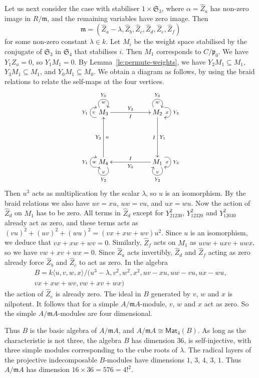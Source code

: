 \documentclass[12pt]{amsart}
\newcommand{\Mat}{\mathsf{Mat}}
\newcommand{\sym}[1]{\mathfrak{S}_{#1}}
\newcommand{\mfm}{\mathfrak{m}}
\newcommand{\mfp}{\mathfrak{p}}
\numberwithin{equation}{section}
\theoremstyle{definition}
\begin{document}
Let us next consider the case with stabiliser $1\times\sym{3}$, where
$\alpha=\hat Z_a$ has non-zero image in $R/\mfm$, and the remaining variables
have zero image. Then 
\[ \mfm=(\hat Z_a-\lambda,\hat Z_b,\hat Z_c,\hat Z_d,\hat
  Z_e,\hat Z_f)\]
for some non-zero constant $\lambda\in k$. Let $M_i$ be the weight space stabilised by the
conjugate of $\sym{3}$ in $\sym{4}$ that stabilises $i$. Then $M_1$
corresponds to $C/\mfp_0$.  We have
$Y_1Z_a=0$, so $Y_1M_1=0$. By Lemma~\ref{le:permute-weights}, we have
$Y_2M_1\subseteq M_1$, $Y_3M_1\subseteq M_1$, and 
$Y_0M_1\subseteq M_0$. We obtain a diagram as follows, by 
using the braid relations to relate the self-maps at the four vertices.
\[ \vcenter{\xymatrix@=20mm{
M_3\ar[r]^{Y_{2}}_I\ar@(dl,ul)[]^{Y_1}_{v}\ar@(ul,ur)[]^{Y_0}_{w}  
& M_2\ar[d]^{Y_{1}}_I\ar@(ul,ur)[]^{Y_0}_{w}\ar@(ur,dr)[]^{Y_3}_{x} \\
M_4\ar[u]^{Y_3}_{u}\ar@(dr,dl)[]^{Y_2}_{v}\ar@(dl,ul)[]^{Y_1}_{w}
&M_1\ar[l]^{Y_{0}}_{I}\ar@(ur,dr)[]^{Y_3}_{x}\ar@(dr,dl)[]^{Y_2}_{v}}} \]
Then $u^3$ acts as multiplication by the scalar $\lambda$, so $u$ is an isomorphism. By the braid relations we also have $uv=xu$, $uw=vu$, and $ux=wu$.
Now the action of $\hat Z_d$ on $M_1$
has to be zero. All terms in $\hat Z_d$ except for $Y_{21230}^2$,
$Y_{12320}^2$ and $Y_{12030}^2$
already act as zero, and these terms acts as $(vu)^2+(uv)^2+(wu)^2=(vx+xw+wv)u^2$. Since $u$ is
an isomorphism, we deduce that $vx+xw+wv=0$. Similarly, $\hat Z_f$ acts on $M_1$ as $uvw+uxv+uwx$, so
we have $vw+xv+wx=0$. Since $\hat Z_a$ acts invertibly, $\hat Z_d$
and $\hat Z_f$ acting as zero already force $\hat Z_b$ and $\hat Z_c$
to act as zero. In the algebra
\begin{multline*} 
B=k\langle u,v,w,x\rangle
/(u^3-\lambda,v^2,w^2,x^2, uv-xu,uw-vu,ux-wu,\\
vx+xw+wv,vw+xv+wx) 
\end{multline*}
the action of $\hat Z_e$ is already zero. The
ideal in $B$ generated by $v$, $w$ and $x$ is nilpotent. It follows that for
a simple $A/\mfm A$-module, $v$, $w$ and $x$ act as zero. So the
simple $A/\mfm A$-modules are four dimensional.

Thus $B$ is the basic algebra of $A/\mfm A$, and $A/\mfm A\cong
\Mat_4(B)$. As long as the characteristic is not three, the algebra $B$ has dimension $36$, is self-injective, with three
simple modules corresponding to the cube roots of $\lambda$. The
radical layers of the
projective indecomposable $B$-modules have dimensions $1$, $3$, $4$,
$3$, $1$. Thus $A/\mfm A$ has dimension $16 \times 36 = 576=4!^2$.\bigskip
\end{document}
